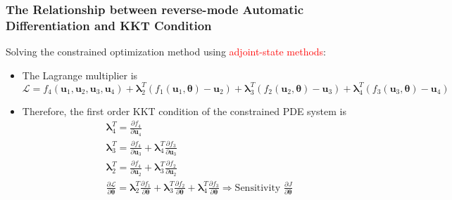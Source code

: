 \documentclass[usenames,dvipsnames]{beamer}
\newcommand{\bt}[0]{\bm{\theta}}
\begin{document}
	
	\begin{frame}
\frametitle{The  Relationship between reverse-mode Automatic Differentiation and KKT Condition}

Solving the constrained optimization method using \textcolor{red}{adjoint-state methods}:

\begin{itemize}
	\item The Lagrange multiplier is 
	{\footnotesize $$ \mathcal{L} = f_4(\mathbf{u}_1, \mathbf{u}_2, \mathbf{u}_3, \mathbf{u}_4) + \bm{\lambda}^{T}_{2}(f_1(\mathbf{u}_1, \bm {\theta}) - \mathbf{u}_2) + \bm{\lambda}^T_{3}(f_2(\mathbf{u}_2, \bm {\theta}) - \mathbf{u}_3) + \bm{\lambda}^T_{4}(f_3(\mathbf{u}_3, \bm {\theta}) - \mathbf{u}_4)$$}
	\item Therefore, the first order KKT condition of the constrained PDE system is 
\begin{eqnarray*}
 && \bm{\lambda}_4^T = \frac{\partial f_4}{\partial \mathbf{u}_4} \nonumber \\
 && \bm{\lambda}_3^T = \frac{\partial f_4}{\partial  \mathbf{u}_3} + \bm{\lambda}_4^T\frac{\partial f_3}{\partial  \mathbf{u}_3} \nonumber \\
 && \bm{\lambda}_2^T = \frac{\partial f_4}{\partial  \mathbf{u}_2} + \bm{\lambda}_3^T\frac{\partial f_2}{\partial  \mathbf{u}_2} \nonumber \\
 && \frac{\partial \mathcal{L}}{\partial \bm{\theta}} = \bm{\lambda}_2^T\frac{\partial f_1}{\partial \bm{\theta}} + \bm{\lambda}_3^T\frac{\partial f_2}{\partial \bm{\theta}} + \bm{\lambda}_4^T\frac{\partial f_3}{\partial \bm{\theta}} \Rightarrow \mbox{Sensitivity $\frac{\partial J}{\partial \bt}$}
\end{eqnarray*}
\end{itemize}

	 
	 
	 
	 
\end{frame}
\end{document}
